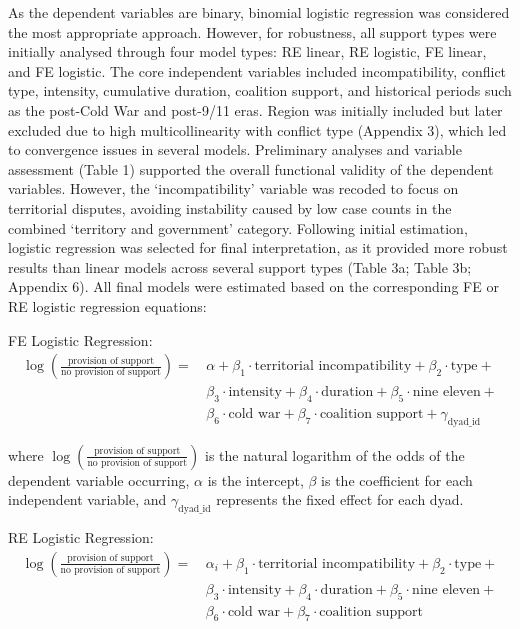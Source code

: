 \documentclass[
]{article}
\begin{document}
As the dependent variables are binary, binomial logistic regression was
considered the most appropriate approach. However, for robustness, all
support types were initially analysed through four model types: RE
linear, RE logistic, FE linear, and FE logistic. The core independent
variables included incompatibility, conflict type, intensity, cumulative
duration, coalition support, and historical periods such as the
post-Cold War and post-9/11 eras. Region was initially included but
later excluded due to high multicollinearity with conflict type
(Appendix 3), which led to convergence issues in several models.
Preliminary analyses and variable assessment (Table 1) supported the
overall functional validity of the dependent variables. However, the
`incompatibility' variable was recoded to focus on territorial disputes,
avoiding instability caused by low case counts in the combined
`territory and government' category. Following initial estimation,
logistic regression was selected for final interpretation, as it
provided more robust results than linear models across several support
types (Table 3a; Table 3b; Appendix 6). All final models were estimated
based on the corresponding FE or RE logistic regression equations:

FE Logistic Regression: \[
\begin{aligned}
\log \left( \frac{\text{provision of support}}{\text{no provision of support}} \right) =\,
&\alpha + 
\beta_1 \cdot \text{territorial incompatibility} + 
\beta_2 \cdot \text{type} + \\
&\beta_3 \cdot \text{intensity} + 
 \beta_4 \cdot \text{duration} + 
\beta_5 \cdot \text{nine eleven} + \\
&\beta_6 \cdot \text{cold war} + 
\beta_7 \cdot \text{coalition support} + 
\gamma_{\text{dyad\_id}}
\end{aligned}
\]

where
\(\log \left( \frac{\text{provision of support}}{\text{no provision of support}} \right)\)
is the natural logarithm of the odds of the dependent variable
occurring, \(\alpha\) is the intercept, \(\beta\) is the coefficient for
each independent variable, and \(\gamma_{\text{dyad\_id}}\) represents
the fixed effect for each dyad.

RE Logistic Regression: \[
\begin{aligned}
\log \left( \frac{\text{provision of support}}{\text{no provision of support}} \right) =\,
&\alpha_i + 
\beta_1 \cdot \text{territorial incompatibility} + 
\beta_2 \cdot \text{type} + \\
&\beta_3 \cdot \text{intensity} + 
\beta_4 \cdot \text{duration} + 
\beta_5 \cdot \text{nine eleven} + \\
&\beta_6 \cdot \text{cold war} + 
\beta_7 \cdot \text{coalition support}
\end{aligned}
\]
\end{document}
